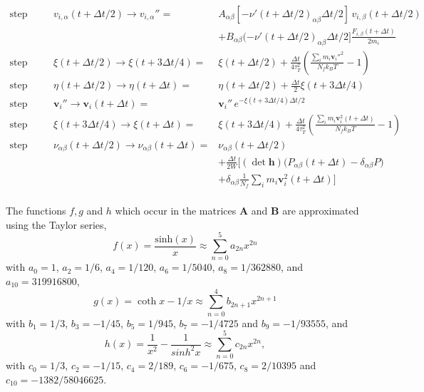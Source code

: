 \documentclass[12pt,letter]{article}
\renewcommand{\vec}[1]{\mathbf{#1}}
\begin{document}
\begin{equation*}
\begin{aligned}
%
\text{step 6:}&\quad&v_{i,\alpha}(t+\Delta t/2)  \to v_{i,\alpha}'' =& A_{\alpha\beta}[-\nu'(t+\Delta t/2)_{\alpha\beta}\Delta t/2]\, v_{i,\beta}(t+\Delta t/2) \\
&&&+ B_{\alpha\beta}(-\nu'(t+\Delta t/2)_{\alpha\beta} \Delta t/2]\frac{  F_{i,\beta}(t+\Delta t)}{2 m_i}\\
%
\text{step 7a:}&\quad&\xi(t+\Delta t/2) \to \xi(t+3\Delta t/4) =& \xi(t+\Delta t/2) + \frac{\Delta t}{4\tau_T^2} \left(\frac{\sum_i m_i \vec v_i''^2}{N_f k_B T} -1 \right)\\
%
\text{step 7b:}&\quad&\eta(t+\Delta t/2) \to \eta(t+\Delta t) =& \eta(t+\Delta t/2) + \frac{\Delta t}{2} \xi(t+3 \Delta t/4)\\
%
\text{step 7c:}&\quad&\vec v_i'' \to \vec v_i(t+\Delta t) =& \vec v_i''\, e^{-\xi(t+3\Delta t/4) \Delta t/2}\\
%
\text{step 7d:}&\quad&\xi(t+3\Delta t/4) \to \xi(t+\Delta t) =& \xi(t+3\Delta t/4) + \frac{\Delta t}{4\tau_T^2} 
\left(\frac{\sum_i m_i \vec v_i^2(t+\Delta t)}{N_f k_B T} -1 \right)\\
%
\text{step 8:}&\quad&\nu_{\alpha\beta}(t+\Delta t/2) \to \nu_{\alpha\beta}(t+\Delta t) =& \nu_{\alpha\beta}(t+\Delta t/2) \\
&&&+
\frac{\Delta t}{2 W} \Big[(\det\vec h) \Big( P_{\alpha \beta}(t+\Delta t) - \delta_{\alpha\beta}P\Big) \\
&&&+\delta_{\alpha\beta}\frac{1}{N_f} \sum_i m_i \vec v^2_i(t+\Delta t)\Big]\\
%
\end{aligned}
\end{equation*}

The functions $f, g$ and $h$ which occur in the matrices $\vec A$ and $\vec B$ are approximated
using the Taylor series,
\begin{equation}
f(x) = \frac{\mathrm{sinh}(x)}{x} \approx \sum_{n=0}^5 a_{2n} x^{2n}
\end{equation}
with $a_0=1$, $a_2 = 1/6$, $a_4 = 1/120$, $a_6 = 1/5040$, $a_8 = 1/362880$,
and $a_{10} = 319916800$,
\begin{equation}
g(x) = \coth x - 1/x \approx \sum_{n=0}^4 b_{2n+1} x^{2n+1}
\end{equation}
with $b_1 = 1/3$, $b_3 = -1/45$, $b_5 = 1/945$, $b_7=-1/4725$ and $b_9 = -1/93555$,
and
\begin{equation}
h(x) = \frac{1}{x^2}-\frac{1}{sinh^2 x} \approx \sum_{n=0}^5 c_{2n} x^{2n},
\end{equation}
with $c_0 = 1/3$, $c_2 = -1/15$, $c_4 = 2/189$, $c_6 = - 1/675$, $c_8 = 2/10395$ and
$c_10 = -1382/58046625$. 
\end{document}
